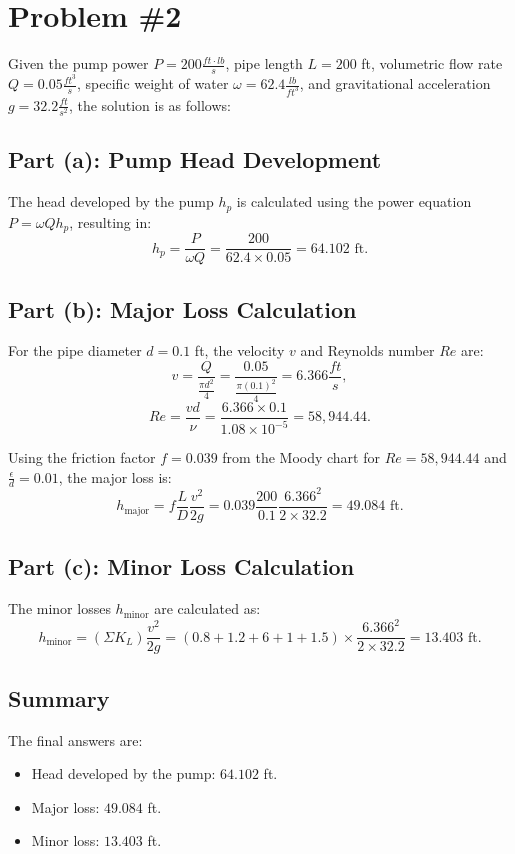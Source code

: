 \documentclass{article}
\begin{document}
\section*{Problem \#2}

Given the pump power $P = 200 \frac{ft \cdot lb}{s}$, pipe length $L = 200$ ft, volumetric flow rate $Q = 0.05 \frac{ft^3}{s}$, specific weight of water $\omega = 62.4 \frac{lb}{ft^3}$, and gravitational acceleration $g = 32.2 \frac{ft}{s^2}$, the solution is as follows:

\subsection*{Part (a): Pump Head Development}
The head developed by the pump $h_p$ is calculated using the power equation $P = \omega Q h_p$, resulting in:
\[ h_p = \frac{P}{\omega Q} = \frac{200}{62.4 \times 0.05} = 64.102 \text{ ft}. \]

\subsection*{Part (b): Major Loss Calculation}
For the pipe diameter $d = 0.1$ ft, the velocity $v$ and Reynolds number $Re$ are:
\[ v = \frac{Q}{\frac{\pi d^2}{4}} = \frac{0.05}{\frac{\pi(0.1)^2}{4}} = 6.366 \frac{ft}{s}, \]
\[ Re = \frac{vd}{\nu} = \frac{6.366 \times 0.1}{1.08 \times 10^{-5}} = 58,944.44. \]

Using the friction factor $f = 0.039$ from the Moody chart for $Re = 58,944.44$ and $\frac{\epsilon}{d} = 0.01$, the major loss is:
\[ h_{\text{major}} = f \frac{L}{D} \frac{v^2}{2g} = 0.039 \frac{200}{0.1} \frac{6.366^2}{2 \times 32.2} = 49.084 \text{ ft}. \]

\subsection*{Part (c): Minor Loss Calculation}
The minor losses $h_{\text{minor}}$ are calculated as:
\[ h_{\text{minor}} = (\Sigma K_L) \frac{v^2}{2g} = (0.8 + 1.2 + 6 + 1 + 1.5) \times \frac{6.366^2}{2 \times 32.2} = 13.403 \text{ ft}. \]

\subsection*{Summary}
The final answers are:
\begin{itemize}
    \item Head developed by the pump: $64.102$ ft.
    \item Major loss: $49.084$ ft.
    \item Minor loss: $13.403$ ft.
\end{itemize}
\end{document}
